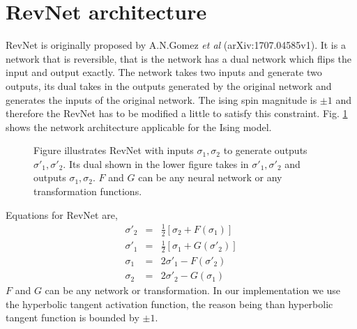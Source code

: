 \documentclass{article}
\begin{document}
\section{RevNet architecture}
RevNet is originally proposed by A.N.Gomez {\it et al} (arXiv:1707.04585v1).
It is a network that is reversible, that is the network has a dual network
which flips the input and output exactly. The network takes two inputs and
generate two outputs, its dual takes in the outputs generated by the original 
network and generates the inputs of the original network.
The ising spin magnitude is $\pm 1$ and therefore the RevNet has to be
modified a little to satisfy this constraint. Fig. \ref{fig:revnet} shows 
the network architecture applicable for the Ising model.
%
\begin{figure}
\caption{Figure illustrates RevNet with inputs $\sigma_1,\sigma_2$ to generate
outputs $\sigma'_1,\sigma'_2$. Its dual shown in the lower figure takes 
in $\sigma'_1,\sigma'_2$
and outputs $\sigma_1,\sigma_2$. 
$F$ and $G$ can be any neural network or any 
transformation functions.}
\label{fig:revnet}
\end{figure}
%
Equations for RevNet are,
\begin{eqnarray} 
\sigma'_2 & = & \frac{1}{2}[ \sigma_2 + F(\sigma_1) ] \\ \nonumber
\sigma'_1 & = & \frac{1}{2}[ \sigma_1 + G(\sigma'_2) ] \\ \nonumber
\sigma_1 & = & 2 \sigma'_1 - F(\sigma'_2) \\ \nonumber
\sigma_2 & = & 2 \sigma'_2 - G(\sigma_1) 
\end{eqnarray}
$F$ and $G$ can be any network or transformation. In our implementation
we use the hyperbolic tangent activation function, the reason being than
hyperbolic tangent function is bounded by $\pm 1$. 
\end{document}
